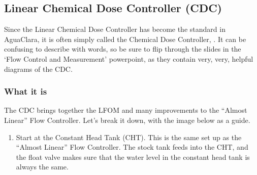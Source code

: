\documentclass[letterpaper,10pt,english]{sphinxmanual}
\begin{document}
\subsection{Linear Chemical Dose Controller (CDC)}
\label{\detokenize{Flow_Control_and_Measurement/FCM_Design:linear-chemical-dose-controller-cdc}}\label{\detokenize{Flow_Control_and_Measurement/FCM_Design:linear-cdc}}
Since the Linear Chemical Dose Controller has become the standard in AguaClara, it is often simply called the Chemical Dose Controller, . It can be confusing to describe with words, so be sure to flip through the slides in the ‘Flow Control and Measurement’ powerpoint, as they contain very, very, helpful diagrams of the CDC.


\subsubsection{What it is}
\label{\detokenize{Flow_Control_and_Measurement/FCM_Design:id9}}
The CDC brings together the LFOM and many improvements to the “Almost Linear” Flow Controller. Let’s break it down, with the image below as a guide.
\begin{enumerate}
\item {} 
Start at the Constant Head Tank (CHT). This is the same set up as the “Almost Linear” Flow Controller. The stock tank feeds into the CHT, and the float valve makes sure that the water level in the constant head tank is always the same.

\end{enumerate}
\end{document}
